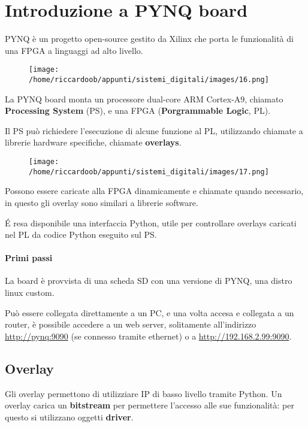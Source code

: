 \chapter{Introduzione a PYNQ board}

PYNQ è un progetto open-source gestito da Xilinx che porta le funzionalità di una FPGA a linguaggi ad alto livello.

\begin{figure}[H]
    \centering
    \texttt{[image: /home/riccardoob/appunti/sistemi\_digitali/images/16.png]}
\end{figure}

La PYNQ board monta un processore dual-core ARM Cortex-A9, chiamato \textbf{Processing System} (PS), e una FPGA (\textbf{Porgrammable Logic}, PL).

Il PS può richiedere l'esecuzione di alcune funzione al PL, utilizzando chiamate a librerie hardware specifiche, chiamate \textbf{overlays}.
\begin{figure}[H]
    \centering
    \texttt{[image: /home/riccardoob/appunti/sistemi\_digitali/images/17.png]}
\end{figure}

Possono essere caricate alla FPGA dinamicamente e chiamate quando necessario, in questo gli overlay sono similari a librerie software.

É resa disponibile una interfaccia Python, utile per controllare overlays caricati nel PL da codice Python eseguito sul PS.

\subsubsection{Primi passi}
La board è provvista di una scheda SD con una versione di PYNQ, una distro linux custom.

Può essere collegata direttamente a un PC, e una volta accesa e collegata a un router, è possibile accedere a un web server, solitamente all'indirizzo \url{http://pynq:9090} (se connesso tramite ethernet) o a \url{http://192.168.2.99:9090}.

\section{Overlay}
Gli overlay permettono di utilizziare IP di basso livello tramite Python. Un overlay carica un \textbf{bitstream} per permettere l'accesso alle sue funzionalità: per questo si utilizzano oggetti \textbf{driver}.

